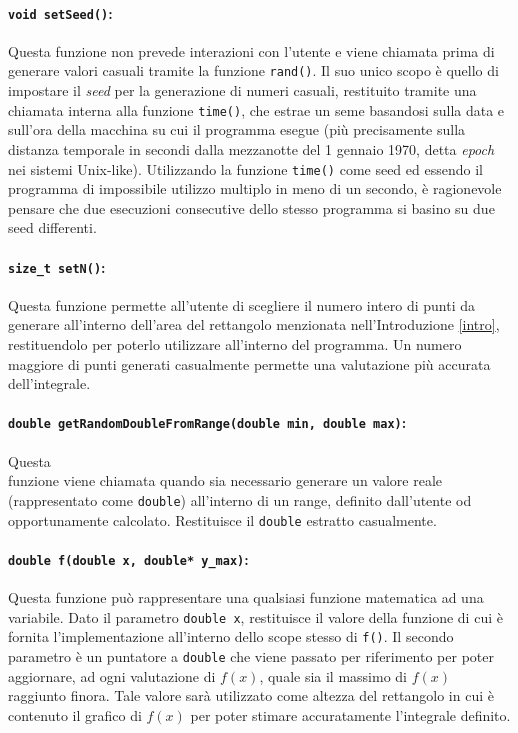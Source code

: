\documentclass[a4paper, 12pt, oneside]{article}
\begin{document}
			\paragraph{\texttt{void setSeed()}:}
			Questa funzione non prevede interazioni con l'utente e viene chiamata prima di generare valori casuali tramite la funzione \texttt{rand()}. Il suo unico scopo è quello di impostare il \textit{seed} per la generazione di numeri casuali, restituito tramite una chiamata interna alla funzione \texttt{time()}, che estrae un seme basandosi sulla data e sull'ora della macchina su cui il programma esegue (più precisamente sulla distanza temporale in secondi dalla mezzanotte del 1\textdegree{} gennaio 1970, detta \textit{epoch} nei sistemi Unix-like). Utilizzando la funzione \texttt{time()} come seed ed essendo il programma di impossibile utilizzo multiplo in meno di un secondo, è ragionevole pensare che due esecuzioni consecutive dello stesso programma si basino su due seed differenti.
			
			\paragraph{\texttt{size\_t setN()}:}
			Questa funzione permette all'utente di scegliere il numero intero di punti da generare all'interno dell'area del rettangolo menzionata nell'Introduzione \ref{intro}, restituendolo per poterlo utilizzare all'interno del programma. Un numero maggiore di punti generati casualmente permette una valutazione più accurata dell'integrale.
			
			\paragraph{\texttt{double getRandomDoubleFromRange(double min, double max)}:}
			Questa\\funzione viene chiamata quando sia necessario generare un valore reale (rappresentato come \texttt{double}) all'interno di un range, definito dall'utente od opportunamente calcolato. Restituisce il \texttt{double} estratto casualmente.
			
			\paragraph{\texttt{double f(double x, double* y\_max)}:}
			Questa funzione può rappresentare una qualsiasi funzione matematica ad una variabile. Dato il parametro \texttt{double x}, restituisce il valore della funzione di cui è fornita l'implementazione all'interno dello scope stesso di \texttt{f()}. Il secondo parametro è un puntatore a \texttt{double} che viene passato per riferimento per poter aggiornare, ad ogni valutazione di $f(x)$, quale sia il massimo di $f(x)$ raggiunto finora. Tale valore sarà utilizzato come altezza del rettangolo in cui è contenuto il grafico di $f(x)$ per poter stimare accuratamente l'integrale definito.
	\newpage
\end{document}
